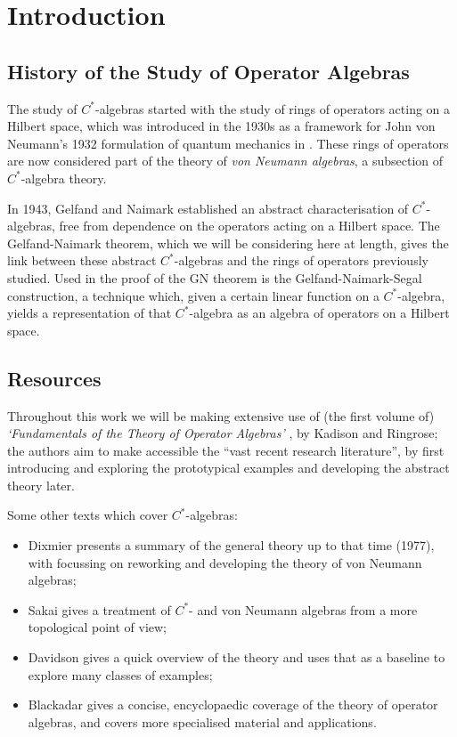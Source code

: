 \documentclass[11pt,a4paper]{report}
\theoremstyle{plain}
\theoremstyle{definition}
\newcommand{\1}{\mathbbm{1}}
\begin{document}
\chapter{Introduction}
\section{History of the Study of Operator Algebras}
The study of $C^\ast$-algebras started with the study of rings of operators 
acting on a Hilbert space, which was introduced in the 1930s as a framework for 
John von Neumann's 1932 formulation of quantum mechanics in \cite{vonneumann32}. 
These rings of operators are now considered part of the theory of \emph{von 
Neumann algebras}, a subsection of $C^\ast$-algebra theory. 



{In 1943, Gelfand and Naimark \cite{gelfand43} established an abstract 
characterisation of $C^\ast$-algebras, free from dependence on the operators 
acting on a Hilbert space. The Gelfand-Naimark theorem, which we will be 
considering here at length, gives the link between these abstract 
$C^\ast$-algebras and the rings of operators previously studied. Used in the 
proof of the GN theorem is the Gelfand-Naimark-Segal construction, a technique 
which, given a certain linear function on a $C^\ast$-algebra, yields a 
representation of that $C^\ast$-algebra as an algebra of operators on a Hilbert 
space.} 

\section{Resources}
Throughout this work we will be making extensive use of (the first volume of) 
\emph{`Fundamentals of the Theory of Operator Algebras'} 
\cite{kadison83,kadison86}, by Kadison and Ringrose; the authors aim to make 
accessible the ``vast recent research literature'', by first introducing and 
exploring the prototypical examples and developing the abstract theory later. 

	
Some other texts which cover $C^\ast$-algebras: 
\begin{itemize}
	\item 	Dixmier \cite{dixmier77} presents a summary of the general theory up to 
	that time (1977), with \cite{dixmier81} focussing on reworking and developing 
	the theory of von Neumann algebras; 
	\item 	Sakai \cite{sakai71} gives a treatment of $C^\ast$- and von Neumann 
	algebras from a more topological point of view; 
	\item	Davidson \cite{davidson96} gives a quick overview of the theory and uses 
	that as a baseline to explore many classes of examples;
	\item 	Blackadar \cite{blackadar06} gives a concise, encyclopaedic coverage of 
	the theory of operator algebras, and covers more specialised material and 
	applications. 

\end{itemize}
	
\end{document}
